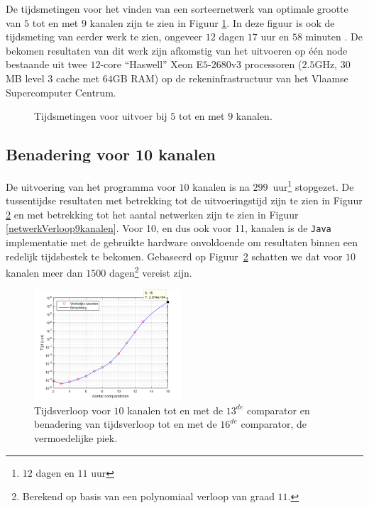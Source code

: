 \documentclass{article}
\begin{document}
De tijdsmetingen voor het vinden van een sorteernetwerk van optimale grootte van $5$ tot en met $9$ kanalen zijn te zien in Figuur \ref{Tijdsresultaten}.
In deze figuur is ook de tijdsmeting van eerder werk te zien, ongeveer $12$ dagen $17$ uur en $58$ minuten \cite{sortingNetworksSize2014}.
De bekomen resultaten van dit werk zijn afkomstig van het uitvoeren op \'e\'en node bestaande uit twee $12$-core ``Haswell'' Xeon E$5$-$2680$v$3$ processoren ($2.5$GHz, $30$MB level $3$ cache met $64$GB RAM) op de rekeninfrastructuur van het Vlaamse Supercomputer Centrum.
\begin{figure}[!h]
\centering
{}
\caption{Tijdsmetingen voor uitvoer bij $5$ tot en met $9$ kanalen.}
\label{Tijdsresultaten}
\end{figure}

\subsection{Benadering voor 10 kanalen}
De uitvoering van het programma voor $10$ kanalen is na $299$~uur\footnote{$12$ dagen en $11$ uur} stopgezet.
De tussentijdse resultaten met betrekking tot de uitvoeringstijd zijn te zien in Figuur \ref{tijdverloop10kanalen} en met betrekking tot het aantal netwerken zijn te zien in Figuur \ref{netwerkVerloop9kanalen}.
Voor 10, en dus ook voor 11, kanalen is de \texttt{Java} implementatie met de gebruikte hardware onvoldoende om resultaten binnen een redelijk tijdsbestek te bekomen.
Gebaseerd op Figuur~\ref{tijdverloop10kanalen} schatten we dat voor $10$ kanalen meer dan $1500$ dagen\footnote{Berekend op basis van een polynomiaal verloop van graad $11$.} vereist zijn. 
\begin{figure}[!h]
\centering
\includegraphics[width = 0.49\textwidth]{Benadering10_paper.png}
\caption{Tijdsverloop voor $10$ kanalen tot en met de  $13^{de}$ comparator en benadering van tijdsverloop tot en met de $16^{de}$ comparator, de vermoedelijke piek.}
\label{tijdverloop10kanalen}
\end{figure}
\end{document}
